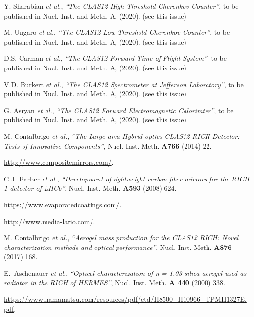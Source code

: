 \documentclass[5p,times,twocolumn]{elsarticle}
\begin{document}
\begin{thebibliography}{00}
Y. Sharabian {\it et al.}, {\it ``The CLAS12 High Threshold Cherenkov Counter''}, 
to be published in Nucl. Inst.  and Meth. A, (2020). (see this issue)
  
M. Ungaro {\it et al.}, {\it ``The CLAS12 Low Threshold Cherenkov Counter''}, 
to be published in Nucl. Inst.  and Meth. A, (2020). (see this issue)

D.S. Carman {\it et al.}, {\it ``The CLAS12 Forward Time-of-Flight System''}, 
to be published in Nucl. Inst.  and Meth. A, (2020). (see this issue)
  
V.D. Burkert {\it et al.}, {\it ``The CLAS12 Spectrometer at Jefferson Laboratory''}, 
to be published in Nucl. Inst.  and Meth. A, (2020). (see this issue)
  
G. Asryan {\it et al.}, {\it ``The CLAS12 Forward Electromagnetic Calorimter''}, 
to be published in Nucl. Inst.  and Meth. A, (2020). (see this issue)
  
M. Contalbrigo {\it et al.}, {\it ``The Large-area Hybrid-optics CLAS12 RICH Detector: Tests of Innovative Components''},
Nucl. Inst. Meth. {\bf A766} (2014) 22.

 \url{http://www.compositemirrors.com/}.

G.J. Barber {\it et al.}, {\it ``Development of lightweight carbon-fiber mirrors for the RICH 1 detector of LHCb''},
Nucl. Inst. Meth. {\bf A593} (2008) 624.

 \url{https://www.evaporatedcoatings.com/}.

 \url{http://www.media-lario.com/}.

M. Contalbrigo {\it et al.}, {\it ``Aerogel mass production for the CLAS12 RICH: Novel characterization methods and optical performance''},
Nucl. Inst. Meth. {\bf A876} (2017) 168.

E.~Aschenauer  {\it et al.}, {\it ``Optical characterization of n = 1.03 silica aerogel used as radiator in the RICH of HERMES''},
Nucl. Inst. Meth. {\bf A 440} (2000) 338.

 \url{https://www.hamamatsu.com/resources/pdf/etd/H8500\_H10966\_TPMH1327E.pdf}.
  

\end{thebibliography}
\end{document}
